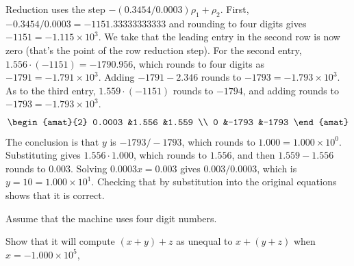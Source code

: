 \begin{exercises}
\begin{answer}
          Reduction uses the 
          step $-(0.3454/0.0003)\rho_1+\rho_2$.
          First, $-0.3454/0.0003=-1151.33333333333$ and rounding to 
          four digits gives $-1151=-1.115\times 10^3$\!.
          We take that the leading entry in the second row is now zero
          (that's the point of the row reduction step).
          For the second entry, $1.556\cdot(-1151)=-1790.956$, which rounds
          to four digits as $-1791=-1.791\times 10^3$\!.
          Adding $-1791-2.346$ rounds to $-1793=-1.793\times 10^3$\!.
          As to the third entry, $1.559\cdot(-1151)$ rounds to $-1794$,
          and adding rounds to $-1793=-1.793\times 10^3$\!.
          \begin{equation*}
            \begin{amat}{2}
              0.0003  &1.556  &1.559  \\
              0       &-1793  &-1793
            \end{amat}
          \end{equation*}
          The conclusion is that $y$ is $-1793/-1793$, which rounds to 
          $1.000=1.000\times 10^0$\!.
          Substituting gives $1.556\cdot 1.000$, which rounds to 
          $1.556$, and then $1.559-1.556$ rounds to $0.003$.
          Solving $0.0003x=0.003$ gives $0.003/0.0003$, which is 
          $y=10=1.000\times 10^1$\!.
          Checking that by substitution into the original equations shows
          that it is correct.
    \end{answer}
    \item 
    Assume that the machine uses four digit numbers.
    \begin{exparts}
      \partsitem Show that it will compute 
         $(x+y)+z$ as unequal to $x+(y+z)$ 
         when $x=-1.000\times 10^5$, 

\end{exparts}
\end{exercises}
